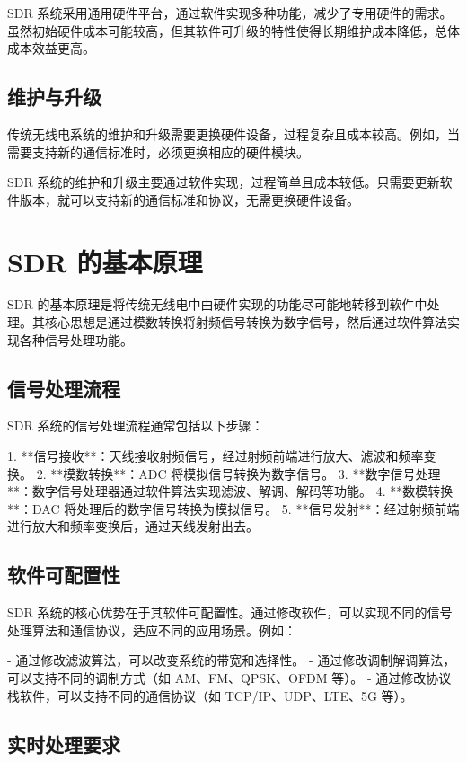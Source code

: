 \documentclass[UTF8]{ctexbook}
\begin{document}
SDR 系统采用通用硬件平台，通过软件实现多种功能，减少了专用硬件的需求。虽然初始硬件成本可能较高，但其软件可升级的特性使得长期维护成本降低，总体成本效益更高。

\subsection{维护与升级}

传统无线电系统的维护和升级需要更换硬件设备，过程复杂且成本较高。例如，当需要支持新的通信标准时，必须更换相应的硬件模块。

SDR 系统的维护和升级主要通过软件实现，过程简单且成本较低。只需要更新软件版本，就可以支持新的通信标准和协议，无需更换硬件设备。

\section{SDR 的基本原理}

SDR 的基本原理是将传统无线电中由硬件实现的功能尽可能地转移到软件中处理。其核心思想是通过模数转换将射频信号转换为数字信号，然后通过软件算法实现各种信号处理功能。

\subsection{信号处理流程}

SDR 系统的信号处理流程通常包括以下步骤：

1. **信号接收**：天线接收射频信号，经过射频前端进行放大、滤波和频率变换。
2. **模数转换**：ADC 将模拟信号转换为数字信号。
3. **数字信号处理**：数字信号处理器通过软件算法实现滤波、解调、解码等功能。
4. **数模转换**：DAC 将处理后的数字信号转换为模拟信号。
5. **信号发射**：经过射频前端进行放大和频率变换后，通过天线发射出去。

\subsection{软件可配置性}

SDR 系统的核心优势在于其软件可配置性。通过修改软件，可以实现不同的信号处理算法和通信协议，适应不同的应用场景。例如：

- 通过修改滤波算法，可以改变系统的带宽和选择性。
- 通过修改调制解调算法，可以支持不同的调制方式（如 AM、FM、QPSK、OFDM 等）。
- 通过修改协议栈软件，可以支持不同的通信协议（如 TCP/IP、UDP、LTE、5G 等）。

\subsection{实时处理要求}
\end{document}

